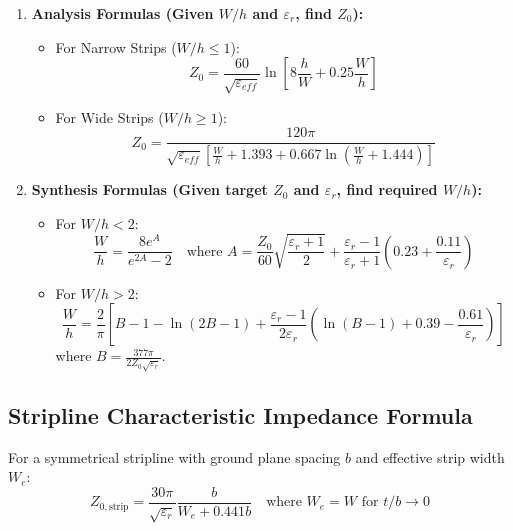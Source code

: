 \documentclass[12pt,a4paper]{article}
\begin{document}
\begin{enumerate}[leftmargin=*, itemsep=5pt]
  \item \textbf{Analysis Formulas (Given $W/h$ and $\varepsilon_r$, find $Z_0$):}
    \begin{itemize}[leftmargin=*, itemsep=3pt]
      \item For Narrow Strips ($W/h \le 1$):
        \begin{equation}
          Z_0 = \frac{60}{\sqrt{\varepsilon_{eff}}} \ln\left[ 8\frac{h}{W} + 0.25\frac{W}{h} \right]
        \end{equation}
      \item For Wide Strips ($W/h \ge 1$):
        \begin{equation}
          Z_0 = \frac{120\pi}{\sqrt{\varepsilon_{eff}} \left[ \frac{W}{h} + 1.393 + 0.667 \ln\left( \frac{W}{h} + 1.444 \right) \right]}
        \end{equation}
    \end{itemize}

  \item \textbf{Synthesis Formulas (Given target $Z_0$ and $\varepsilon_r$, find required $W/h$):}
    \begin{itemize}[leftmargin=*, itemsep=3pt]
      \item For $W/h < 2$:
        \begin{equation}
          \frac{W}{h} = \frac{8 e^A}{e^{2A} - 2} \quad \text{where } A = \frac{Z_0}{60} \sqrt{\frac{\varepsilon_r+1}{2}} + \frac{\varepsilon_r-1}{\varepsilon_r+1} \left( 0.23 + \frac{0.11}{\varepsilon_r} \right)
        \end{equation}
      \item For $W/h > 2$:
        \begin{equation}
          \frac{W}{h} = \frac{2}{\pi} \left[ B - 1 - \ln(2B-1) + \frac{\varepsilon_r-1}{2\varepsilon_r} \left( \ln(B-1) + 0.39 - \frac{0.61}{\varepsilon_r} \right) \right]
        \end{equation}
        where $B = \frac{377\pi}{2 Z_0 \sqrt{\varepsilon_r}}$.
    \end{itemize}
\end{enumerate}

\subsection{Stripline Characteristic Impedance Formula}
For a symmetrical stripline with ground plane spacing $b$ and effective strip width $W_e$:
\begin{equation}
  Z_{0,\text{strip}} = \frac{30\pi}{\sqrt{\varepsilon_r}} \frac{b}{W_e + 0.441b} \quad \text{where } W_e = W \text{ for } t/b \to 0
\end{equation}
\end{document}
